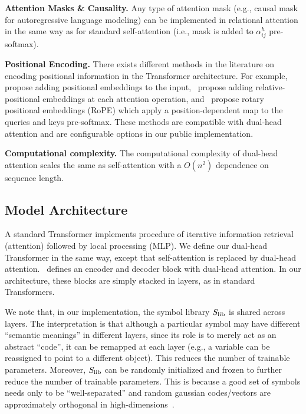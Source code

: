 \textbf{Attention Masks \& Causality.} Any type of attention mask (e.g., causal mask for autoregressive language modeling) can be implemented in relational attention in the same way as for standard self-attention (i.e., mask is added to $\alpha_{ij}^h$ pre-softmax).

\textbf{Positional Encoding.} There exists different methods in the literature on encoding positional information in the Transformer architecture. For example,~\citet{vaswani} propose adding positional embeddings to the input,~\citet{shaw} propose adding relative-positional embeddings at each attention operation, and~\citet{RoPE} propose rotary positional embeddings (RoPE) which apply a position-dependent map to the queries and keys pre-softmax. These methods are compatible with dual-head attention and are configurable options in our public implementation.

\textbf{Computational complexity.} The computational complexity of dual-head attention scales the same as self-attention with a $O(n^2)$ dependence on sequence length.


\subsection{Model Architecture}

A standard Transformer implements procedure of iterative information retrieval (attention) followed by local processing (MLP). We define our dual-head Transformer in the same way, except that self-attention is replaced by dual-head attention.~ defines an encoder and decoder block with dual-head attention. In our architecture, these blocks are simply stacked in layers, as in standard Transformers.

We note that, in our implementation, the symbol library $S_\mathrm{lib}$ is shared across layers. The interpretation is that although a particular symbol may have different ``semantic meanings'' in different layers, since its role is to merely act as an abstract ``code'', it can be remapped at each layer (e.g., a variable can be reassigned to point to a different object). This reduces the number of trainable parameters. Moreover, $S_\mathrm{lib}$ can be randomly initialized and frozen to further reduce the number of trainable parameters. This is because a good set of symbols needs only to be ``well-separated'' and random gaussian codes/vectors are approximately orthogonal in high-dimensions~\citep{needcitation?citationonrandomcodes?}.

